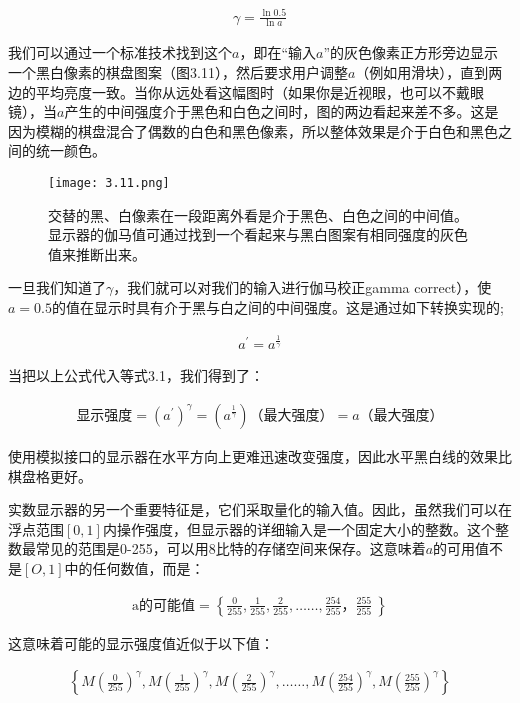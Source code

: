 \documentclass[lang=cn,12pt]{elegantbook}
\begin{document}
\[
  \begin{aligned}
  \gamma = \frac{\ln 0.5}{\ln a} 
  \end{aligned}
\]

我们可以通过一个标准技术找到这个$a$，即在“输入$a$”的灰色像素正方形旁边显示一个黑白像素的棋盘图案（图3.11），然后要求用户调整$a$（例如用滑块），直到两边的平均亮度一致。当你从远处看这幅图时（如果你是近视眼，也可以不戴眼镜），当$a$产生的中间强度介于黑色和白色之间时，图的两边看起来差不多。这是因为模糊的棋盘混合了偶数的白色和黑色像素，所以整体效果是介于白色和黑色之间的统一颜色。

\begin{figure}[htb]
  \centering
  \texttt{[image: 3.11.png]}
  \caption{交替的黑、白像素在一段距离外看是介于黑色、白色之间的中间值。显示器的伽马值可通过找到一个看起来与黑白图案有相同强度的灰色值来推断出来。}
\end{figure}

一旦我们知道了$\gamma$，我们就可以对我们的输入进行伽马校正gamma correct），使$a=0.5$的值在显示时具有介于黑与白之间的中间强度。这是通过如下转换实现的;

\[
  \begin{aligned}
  a^{'} = a^{\frac{1}{\gamma } }
  \end{aligned}
\]

当把以上公式代入等式3.1，我们得到了：

\[
  \begin{aligned}
  \mbox{显示强度} = (a^{'})^\gamma = (a^{\frac{1}{\gamma}})\mbox{（最大强度）} = a\mbox{（最大强度）}
  \end{aligned}
\]

\begin{note}
使用模拟接口的显示器在水平方向上更难迅速改变强度，因此水平黑白线的效果比棋盘格更好。
\end{note}

实数显示器的另一个重要特征是，它们采取量化的输入值。因此，虽然我们可以在浮点范围$[0,1]$内操作强度，但显示器的详细输入是一个固定大小的整数。这个整数最常见的范围是0-255，可以用8比特的存储空间来保存。这意味着$a$的可用值不是$[O,1]$中的任何数值，而是：

\[
  \begin{aligned}
  \mbox{a的可能值} = \left\{ \frac{0}{255},\frac{1}{255},\frac{2}{255},……,\frac{254}{255}，\frac{255}{255}\ \right\}
  \end{aligned}
\]

这意味着可能的显示强度值近似于以下值：

\[
  \begin{aligned}
    \left\{ M(\frac{0}{255})^\gamma ,M(\frac{1}{255})^\gamma ,M(\frac{2}{255})^\gamma ,……,M(\frac{254}{255})^\gamma ,M(\frac{255}{255})^\gamma \right\}
  \end{aligned}
\]
\end{document}
